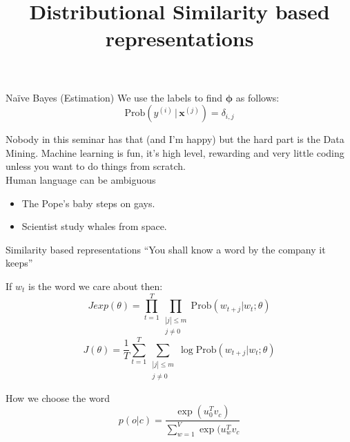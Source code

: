 \documentclass{beamer}
\newcommand{\Prob}{\text{Prob}}
\newcommand{\bx}{\mathbf{x}}
\newcommand{\bphi}{\pmb{\phi}}
\newcommand{\given}{\, | \,}
\begin{document}
\begin{frame}{Na\"ive Bayes (Estimation)}
    We use the labels to find $\bphi$ as follows:
     $$\Prob(y^{(i)}\given \bx^{(j)} ) = \delta_{i,j}$$
\end{frame}

\begin{frame}
Nobody in this seminar has that (and I'm happy) but the hard part is the Data Mining.
Machine learning is fun, it's high level, rewarding and very little coding unless you want to do things from scratch.\\

    Human language can be ambiguous
    \begin{itemize}
            \item The Pope's baby steps on gays.
            \item Scientist study whales from space.
    \end{itemize}
\end{frame}

\begin{frame}{Similarity based representations}
    ``You shall know a word by the company it keeps''\\[5mm]
    \hspace*{}

\end{frame}

\begin{frame}
    \title{Distributional Similarity based representations}
    If $w_t$ is the word we care about then:
    $$Jexp(\theta) = \prod_{t=1}^T \prod_{\substack{|j|\leq m\\ j\neq 0}} \Prob(w_{t+j}| w_t; \theta)$$
    $$J(\theta) = \frac 1T \sum_{t=1}^T \sum_{\substack{|j|\leq m\\ j\neq 0}}\log \Prob(w_{t+j}| w_t; \theta)$$
\end{frame}

\begin{frame}{How we  choose the word}
     $$p(o|c) = \frac{\exp(u_0^T v_c)}{\sum_{w=1}^V \exp(u_w^Tv_c}$$
\end{frame}
\end{document}
